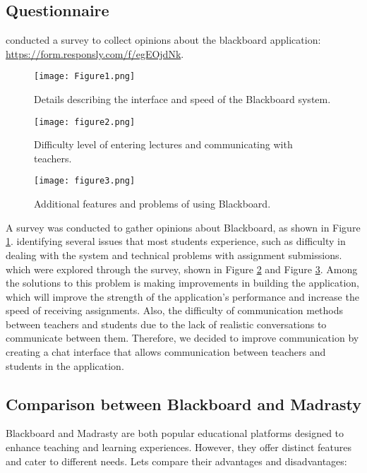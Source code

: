 \documentclass[a4paper,12pt]{article}
\begin{document}
\newpage

\subsection{Questionnaire}
conducted a survey to collect opinions about the blackboard application:
 \url{https://form.responsly.com/f/egEOjdNk}. 

\begin{figure}[h]
    \centering
    \texttt{[image: Figure1.png]} 
    \caption{Details describing the interface and speed of the Blackboard system.}
    \label{fig:figure1}
\end{figure}


\begin{figure}[h]
    \centering
    \texttt{[image: figure2.png]} 
    \caption{Difficulty level of entering lectures and communicating with teachers.}
    \label{fig:figure2}
\end{figure}

\newpage

\begin{figure}[h]
    \centering
    \texttt{[image: figure3.png]}
    \caption{Additional features and problems of using Blackboard.}
    \label{fig:figure3}
\end{figure}

A survey was conducted to gather opinions about Blackboard, as shown in
Figure \ref{fig:figure1}. identifying several issues that most students experience, such as difficulty in dealing with the system and technical problems with assignment submissions.
which were explored through the survey, shown in Figure \ref{fig:figure2} and Figure \ref{fig:figure3}. Among the solutions to this problem is making improvements in building the application, which will improve the strength of the application's performance and increase the speed of receiving assignments. Also, the difficulty of communication methods between teachers and students due to the lack of realistic conversations to communicate between them. Therefore, we decided to improve communication by creating a chat interface that allows communication between teachers and students in the
application.

\newpage

\subsection{Comparison between Blackboard and Madrasty}
Blackboard and Madrasty are both popular educational platforms designed to
enhance teaching and learning experiences. However, they offer distinct features and cater to different needs. Lets compare their advantages and disadvantages:
\end{document}
